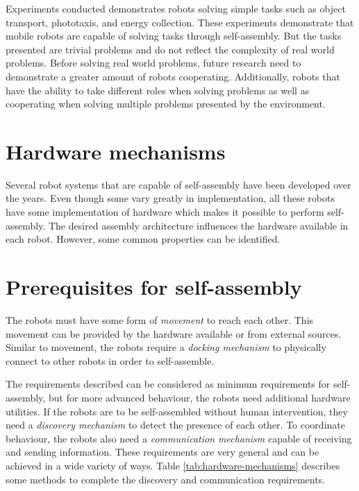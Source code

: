 Experiments conducted demonstrates robots solving simple tasks such as object transport\cite{gro_autonomous_2006}, phototaxis\cite{trianni_evolving_2004}, and energy collection\cite{montanier_adaptive_2014, weel_emergence_2012}.
These experiments demonstrate that mobile robots are capable of solving tasks through self-assembly.
But the tasks presented are trivial problems and do not reflect the complexity of real world problems.
Before solving real world problems, future research need to demonstrate a greater amount of robots cooperating.
Additionally, robots that have the ability to take different roles when solving problems as well as cooperating when solving multiple problems presented by the environment.

\section{Hardware mechanisms}
\label{sec:hardware}
Several robot systems that are capable of self-assembly have been developed over the years\cite{gross_self-assembly_2008, wei_sambot:_2011, brandt_atron_2007}.
Even though some vary greatly in implementation, all these robots have some implementation of hardware which makes it possible to perform self-assembly.
The desired assembly architecture influences the hardware available in each robot.
However, some common properties can be identified.  

\section*{Prerequisites for self-assembly}
The robots must have some form of \emph{movement} to reach each other.
This movement can be provided by the hardware available or from external sources.
Similar to movement, the robots require a \emph{docking mechanism} to physically connect to other robots in order to self-assemble.

The requirements described can be considered as minimum requirements for self-assembly, but for more advanced behaviour, the robots need additional hardware utilities.
If the robots are to be self-assembled without human intervention, they need a \emph{discovery mechanism} to detect the presence of each other.
To coordinate behaviour, the robots also need a \emph{communication mechanism} capable of receiving and sending information.
These requirements are very general and can be achieved in a wide variety of ways. Table \ref{tab:hardware-mechanisms} describes some methods to complete the discovery and communication requirements.


